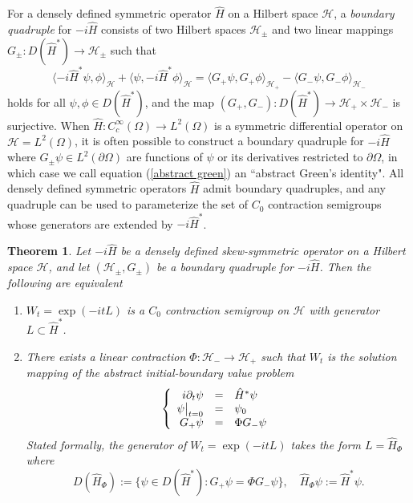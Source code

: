 \documentclass{article}
\numberwithin{equation}{section}
\newtheorem*{theorem*}{Theorem}
\begin{document}
\par
For a densely defined symmetric operator $\hat{H}$ on a Hilbert space $\mathcal{H}$, a \textit{boundary quadruple} for $-i\hat{H}$ consists of two Hilbert spaces $\mathcal{H}_\pm$ and two linear mappings $G_\pm:D(\hat{H}^*)\to\mathcal{H}_\pm$ such that
\begin{equation}\label{abstract green}
    \langle-i\hat{H}^*\psi, \phi \rangle_{\mathcal{H}} + \langle\psi,-i\hat{H}^*\phi\rangle_{\mathcal{H}}=\langle G_+\psi,G_+\phi\rangle_{\mathcal{H}_+}-\langle G_-\psi,G_- \phi \rangle_{\mathcal{H}_-}
\end{equation}
holds for all $\psi, \phi \in D(\hat{H}^*)$, and the map $(G_+,G_-):D(\hat{H}^*)\to \mathcal{H}_+\times \mathcal{H}_-$ is surjective. When $\hat{H}:C_c^\infty(\Omega)\to L^2(\Omega)$ is a symmetric differential operator on $\mathcal{H}=L^2(\Omega)$, it is often possible to construct a boundary quadruple for $-i\hat{H}$ where $G_\pm \psi\in L^2(\partial \Omega)$ are functions of $\psi$ or its derivatives restricted to $\partial \Omega$, in which case we call equation (\ref{abstract green}) an ``abstract Green's identity". All densely defined symmetric operators $\hat{H}$ admit boundary quadruples, and any quadruple can be used to parameterize the set of $C_0$ contraction semigroups whose generators are extended by $-i\hat{H}^*$.
\begin{theorem*}
    \cite[Theorem 3.10]{Arendt2023}  Let $-i\hat{H}$ be a densely defined skew-symmetric operator on a Hilbert space $\mathcal{H}$, and let $(\mathcal{H}_\pm,G_\pm)$ be a boundary quadruple for $-i\hat{H}$. Then the following are equivalent
    \begin{enumerate}
        \item[(a)] $W_t=\exp(-itL)$ is a $C_0$ contraction semigroup on $\mathcal{H}$ with generator $L\subset \hat{H}^*$.
        \item[(b)] There exists a linear contraction $\Phi:\mathcal{H_-}\to \mathcal{H}_+$ such that $W_t$ is the solution mapping of the abstract initial-boundary value problem  
    \begin{equation}\label{intro abstract IBVP}
    \left\{\begin{array}{rclr}
       i\partial_t \psi&=& \hat{H}^* \psi \quad 
       \\
       \psi\big{|}_{t=0} &=&\psi_0 
       \\
    G_+\psi&=&\Phi G_- \psi
    \end{array}
    \right.
\end{equation}
Stated formally, the generator of $W_t=\exp(-itL)$ takes the form $L=\hat{H}_{\Phi}$ where
\begin{equation}\label{Dom B}
            D(\hat{H}_\Phi):=\{\psi \in D(\hat{H}^*):G_+\psi=\Phi G_-\psi \}, \quad \hat{H}_\Phi\psi:=\hat{H}^*\psi. 
        \end{equation}
    \end{enumerate}
\end{theorem*}
\end{document}
